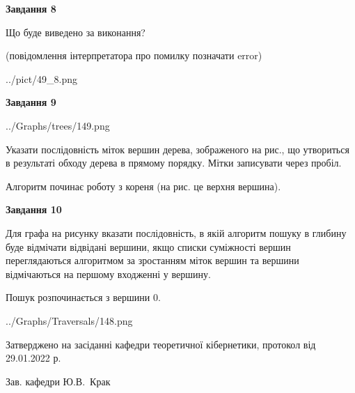 \documentclass[12pt, ukrainian]{article}
\begin{document}
{\begin {large}
{\begin {center}\textbf{Завдання 8}\end {center}}\par
Що буде виведено за виконання?\par
 (повідомлення інтерпретатора про помилку позначати error)\par
\begin{center}
	{../pict/49_8.png}
\end{center}
\newpage

{\begin {center}\textbf{Завдання 9}\end {center}}\par

\begin{center}
	{../Graphs/trees/149.png}
\end{center}
Указати послідовність міток вершин дерева, зображеного на рис., що утвориться в результаті обходу дерева в прямому порядку. Мітки записувати через пробіл.\par Алгоритм починає роботу з кореня (на рис. це верхня вершина).\par
\newpage

{\begin {center}\textbf{Завдання 10}\end {center}}\par
Для графа на рисунку вказати послідовність, в якій алгоритм пошуку в глибину буде відмічати відвідані вершини, якщо списки суміжності вершин переглядаються алгоритмом за зростанням міток вершин та вершини відмічаються на першому вход\-женні у вершину.\par
Пошук розпочинається з вершини 0.\par

\begin{center}
	{../Graphs/Traversals/148.png}
\end{center}\par
\newpage


\end {large}
}
{\smallskip \begin {small} Затверджено на засіданні кафедри теоретичної кібернетики, протокол  від   29.01.2022 р.\par\smallskip\smallskip
{\parbox {6.5 cm}{Зав. кафедри \dotfill Ю.В.~Крак}} \end{small}}
\end{document}
